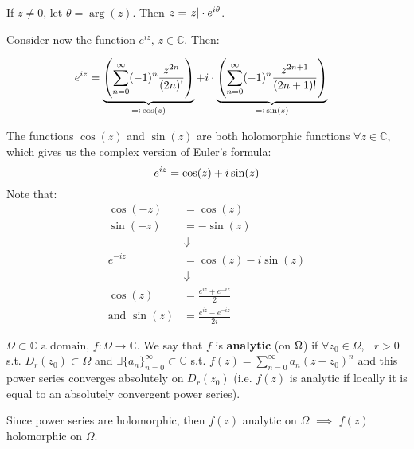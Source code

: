 \begin{remark}
If $z\neq0$, let $\theta = \arg(z)$. Then $z=\abs{z}\cdot e^{i\theta}$.
\end{remark}
\begin{remark}


Consider now the function $e^{iz}, \, z\in\mathbb{C}$. Then:

\begin{align*}
    e^{iz}&=\underbrace{\left( \sum_{n=0}^\infty (-1)^n \frac{z^{2n}}{(2n)!}  \right)}_{=\vcentcolon \, \cos(z)} + i \cdot \underbrace{\left( \sum_{n=0}^\infty (-1)^n \frac{z^{2n+1}}{(2n+1)!}  \right)}_{=\vcentcolon \, \sin(z)}
\end{align*}

The functions $\cos(z)$ and $\sin(z)$ are both holomorphic functions $\forall z \in \mathbb{C}$, which gives us the complex version of Euler's formula:
\begin{equation*}
e^{iz} = \cos(z) + i\sin(z)\\
\end{equation*}
Note that:
\begin{align*}
    \cos(-z) &= \cos(z)\\
    \sin(-z) &= -\sin(z)\\
    &\Downarrow\\
    e^{-iz} &= \cos(z) - i\sin(z)\\
    &\Downarrow\\
    \cos(z) &= \frac{e^{iz}+e^{-iz}}{2}\\
    \text{and } \sin(z) &= \frac{e^{iz}-e^{-iz}}{2i}
\end{align*}
\end{remark}

\begin{definition}
\begin{math}
\Omega \subset \mathbb{C} \text{ a domain, } f:\Omega \rightarrow \mathbb{C}
\end{math}. We say that $f$ is \textbf{analytic} (on $\Omega$) if $\forall z_0 \in \Omega$, $\exists r>0$ s.t. $D_r(z_0) \subset \Omega$ and $\exists \{ a_n  \}_{n=0}^\infty \subset \mathbb{C}$ s.t. $f(z) = \sum_{n=0}^\infty a_n (z-z_0)^n$ and this power series converges absolutely on $D_r(z_0)$ (i.e. $f(z)$ is analytic if locally it is equal to an absolutely convergent power series).
\end{definition}

\begin{remark}
Since power series are holomorphic, then $f(z)$ analytic on  $\Omega$ $\implies$ $f(z)$ holomorphic on $\Omega$. 
\end{remark}

